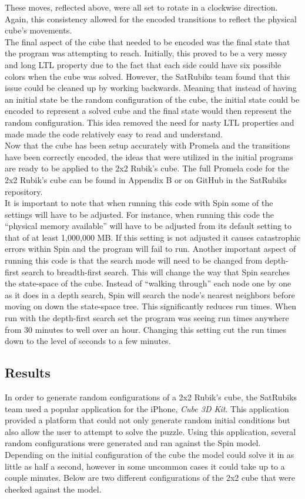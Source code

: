 \documentclass{article}
\begin{document}
These moves, reflected above, were all set to rotate in a clockwise direction. Again, this consistency allowed for the encoded transitions to reflect the physical cube's movements. \\[3mm]
The final aspect of the cube that needed to be encoded was the final state that the program was attempting to reach. Initially, this proved to be a very messy and long LTL property due to the fact that each side could have six possible colors when the cube was solved. However, the SatRubiks team found that this issue could be cleaned up by working backwards. Meaning that instead of having an initial state be the random configuration of the cube, the initial state could be encoded to represent a solved cube and the final state would then represent the random configuration. This idea removed the need for nasty LTL properties and made made the code relatively easy to read and understand. \\[3mm]
Now that the cube has been setup accurately with Promela and the transitions have been correctly encoded, the ideas that were utilized in the initial programs are ready to be applied to the 2x2 Rubik's cube. The full Promela code for the 2x2 Rubik's cube can be found in Appendix B or on GitHub in the SatRubiks repository. \\[3mm]
It is important to note that when running this code with Spin some of the settings will have to be adjusted. For instance, when running this code the ``physical memory available'' will have to be adjusted from its default setting to that of at least 1,000,000 MB. If this setting is not adjusted it causes catastrophic errors within Spin and the program will fail to run. Another important aspect of running this code is that the search mode will need to be changed from depth-first search to breadth-first search. This will change the way that Spin searches the state-space of the cube. Instead of ``walking through'' each node one by one as it does in a depth search, Spin will search the node's nearest neighbors before moving on down the state-space tree. This significantly reduces run times. When run with the depth-first search set the program was seeing run times anywhere from 30 minutes to well over an hour. Changing this setting cut the run times down to the level of seconds to a few minutes. 
\subsection{Results}
In order to generate random configurations of a 2x2 Rubik's cube, the SatRubiks team used a popular application for the iPhone, \textit{Cube 3D Kit}. This application provided a platform that could not only generate random initial conditions but also allow the user to attempt to solve the puzzle. Using this application, several random configurations were generated and ran against the Spin model. Depending on the initial configuration of the cube the model could solve it in as little as half a second, however in some uncommon cases it could take up to a couple minutes. Below are two different configurations of the 2x2 cube that were checked against the model. \\
\end{document}
